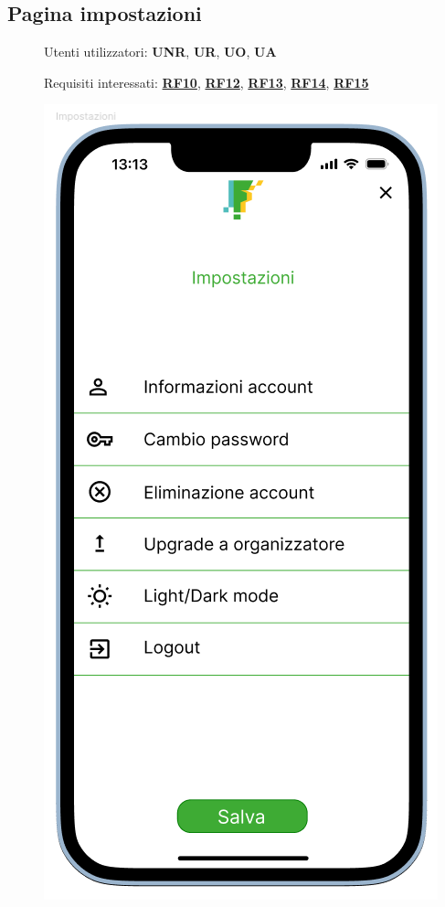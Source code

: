 \documentclass{article}
\begin{document}
\subsection{Pagina impostazioni}
\begin{description}
    \item[] Utenti utilizzatori: \textbf{UNR}, \textbf{UR}, \textbf{UO}, \textbf{UA}
    \item[] Requisiti interessati: \hyperref[rf_10]{\textbf{RF10}}, \hyperref[rf_12]{\textbf{RF12}}, \hyperref[rf_13]{\textbf{RF13}}, \hyperref[rf_14]{\textbf{RF14}}, \hyperref[rf_15]{\textbf{RF15}}
    \item[] \begin{center}
              \includegraphics[scale=0.6]{Impostazioni.png}

\end{center}
\end{description}
\end{document}
